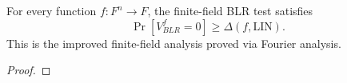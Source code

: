 \begin{theorem}
\label{thm:ff-blr-improved-analysis}
\leanok
For every function $f : F^n \to F$, the finite-field BLR test
  satisfies
  \[
    \Pr[V_{BLR}^f = 0] \ge \Delta(f,\mathrm{LIN}).
  \]
  This is the improved finite-field analysis proved via Fourier analysis.
\end{theorem}
\begin{proof}
\leanok
\end{proof}
